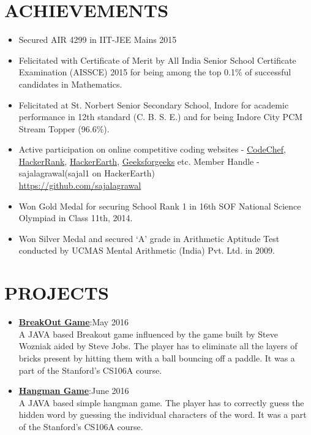 \documentclass[line, margin]{res}
\begin{document}
\begin{resume}
\section{ACHIEVEMENTS}
\begin{itemize}
\item Secured AIR 4299 in IIT-JEE Mains 2015
\item Felicitated with Certificate of Merit by All India Senior School Certificate Examination (AISSCE) 2015 for being among the top 0.1\% of successful candidates in Mathematics.
\item Felicitated at St. Norbert Senior Secondary School, Indore for academic performance in 12th standard (C. B. S. E.) and for being Indore City PCM Stream Topper (96.6\%).
\item Active participation on online competitive coding websites - \href{https://www.codechef.com/users/sajalagrawal}{CodeChef}, \href{https://www.hackerrank.com/sajalagrawal}{HackerRank}, \href{https://www.hackerearth.com/@sajal1}{HackerEarth}, \href{http://www.practice.geeksforgeeks.org/user-profile.php?user=sajalagrawal}{Geeksforgeeks} etc.
Member Handle - sajalagrawal(sajal1 on HackerEarth)\\
\url{https://github.com/sajalagrawal}
\item Won Gold Medal for securing School Rank 1 in 16th SOF National Science Olympiad in Class 11th, 2014.
\item Won Silver Medal and secured ‘A’ grade in Arithmetic Aptitude Test conducted by UCMAS Mental Arithmetic (India) Pvt. Ltd. in 2009.
\end{itemize}

\section{PROJECTS}
\begin{itemize}
\item\textbf{\href{https://github.com/sajalagrawal/Breakout-Game}{BreakOut Game}}:\hfill May 2016\\ A JAVA based Breakout game influenced by the game built by Steve Wozniak aided by Steve Jobs. The player has to eliminate all the layers of bricks present by hitting them with a ball bouncing off a paddle. It was a part of the Stanford's CS106A course.
\item\textbf{\href{https://github.com/sajalagrawal/Hangman-Game}{Hangman Game}}:\hfill June 2016\\ A JAVA based simple hangman game. The player has to correctly guess the hidden word by guessing the individual characters of the word. It was a part of the Stanford's CS106A course.
\end{itemize}


\end{resume}
\end{document}
